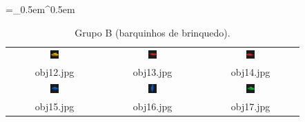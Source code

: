 \begin{table}[H]
  \centering
  \caption{Grupo B (barquinhos de brinquedo).}
  \tabulinesep =_0.5em^0.5em
  \everyrow{\tabucline[0.4pt]-}
  \begin{tabu}{|ccc|}
    \includegraphics[width=0.1\textwidth,height=0.1\textwidth]{imagens/coil_100/barquinhos_brinquedos/obj3__0.png} &
    \includegraphics[width=0.1\textwidth,height=0.1\textwidth]{imagens/coil_100/barquinhos_brinquedos/obj38__0.png} &
    \includegraphics[width=0.1\textwidth,height=0.1\textwidth]{imagens/coil_100/barquinhos_brinquedos/obj38__0_1.png}
    \\
    \scriptsize{obj12.jpg} & \scriptsize{obj13.jpg} & \scriptsize{obj14.jpg}
    \\
    \includegraphics[width=0.1\textwidth,height=0.1\textwidth]{imagens/coil_100/barquinhos_brinquedos/obj42__0.png} &
    \includegraphics[width=0.1\textwidth,height=0.1\textwidth]{imagens/coil_100/barquinhos_brinquedos/obj42__0_1.png} &
    \includegraphics[width=0.1\textwidth,height=0.1\textwidth]{imagens/coil_100/barquinhos_brinquedos/obj78__0.png}
    \\
    \scriptsize{obj15.jpg} & \scriptsize{obj16.jpg} & \scriptsize{obj17.jpg}
  \end{tabu}
\end{table}

